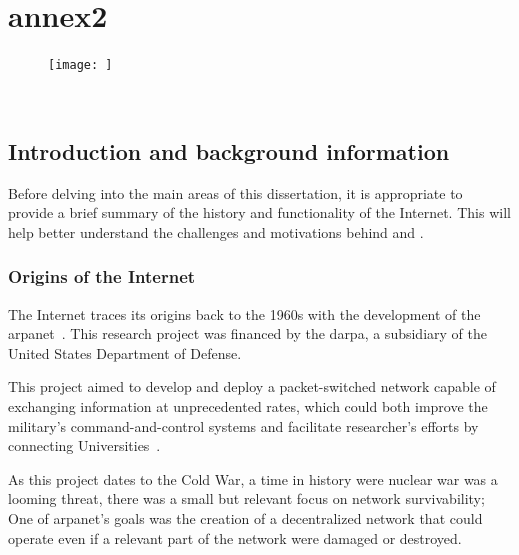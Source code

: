 
%

\chapter{annex2}
\label{ann:2}

\begin{figure}[htbp]
\centering
\texttt{[image: ]}
   	\caption{~\cite{}}
   	\label{fig:c}
\end{figure}

\section{Introduction and background information}
\label{sec:intro}

Before delving into the main areas of this dissertation, it is appropriate to provide a brief summary of the history and functionality of the Internet. This will help better understand the challenges and motivations behind  and .
\subsection{Origins of the Internet} %
The Internet traces its origins back to the 1960s with the development of the \gls{arpanet}~\cite{leiner_brief_2009}. This research project was financed by the \gls{darpa}, a subsidiary of the United States Department of Defense.

This project aimed to develop and deploy a packet-switched network capable of exchanging information at unprecedented rates, which could both improve the military's command-and-control systems and facilitate researcher's efforts by connecting Universities~\cite{interview_Dr_Charles_Herzfeld}.



As this project dates to the Cold War, a time in history were nuclear war was a looming threat, there was a small but relevant focus on network survivability; One of \gls{arpanet}’s goals was the creation of a decentralized network that could operate even if a relevant part of the network were damaged or destroyed. 


